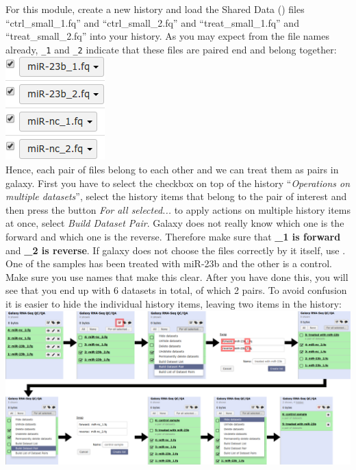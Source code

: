 For this module, create a new history and load the Shared Data (\textit{\datalibrarydirrnaseqadvanced}) files ``ctrl\_small\_1.fq'' and ``ctrl\_small\_2.fq'' and ``treat\_small\_1.fq'' and ``treat\_small\_2.fq'' into your history. As you may expect from the file names already, \verb|_1| and \verb|_2| indicate that these files are paired end and belong together:\\
\includegraphics[scale=0.65]{figures/qc_01.png}\\
Hence, each pair of files belong to each other and we can treat them as pairs in galaxy. First you have to select the checkbox on top of the history ``\textit{Operations on multiple datasets}'', select the history items that belong to the pair of interest and then press the button \textit{For all selected...} to apply actions on multiple history items at once, select \textit{Build Dataset Pair}. Galaxy does not really know which one is the forward and which one is the reverse. Therefore make sure that \textbf{\_1 is forward} and \textbf{\_2 is reverse}. If galaxy does not choose the files correctly by it itself, use . One of the samples has been treated with miR-23b and the other is a control. Make sure you use names that make this clear. After you have done this, you will see that you end up with 6 datasets in total, of which 2 pairs. To avoid confusion it is easier to hide the individual history items, leaving two items in the history:\\
\includegraphics[width=\textwidth]{figures/qc_02.png}\\
